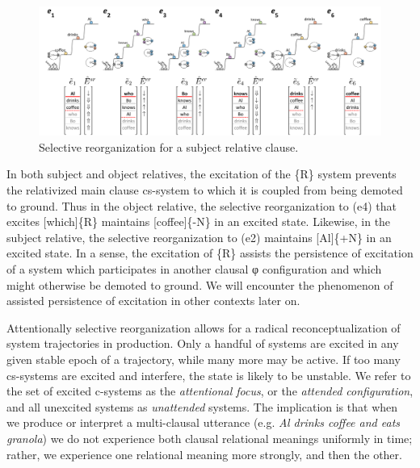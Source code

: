   
\begin{figure}
\includegraphics[width=\textwidth]{figures/Tilsen-img103.png}
\caption{Selective reorganization for a subject relative clause.}
\label{fig:4:53}
\end{figure}
 

  In both subject and object relatives, the excitation of the \{R\} system prevents the relativized main clause cs-system to which it is coupled from being demoted to ground. Thus in the object relative, the selective reorganization to (e4) that excites [which]\{R\} maintains [coffee]\{-N\} in an excited state. Likewise, in the subject relative, the selective reorganization to (e2) maintains [Al]\{+N\} in an excited state. In a sense, the excitation of \{R\} assists the persistence of excitation of a system which participates in another clausal φ configuration and which might otherwise be demoted to ground. We will encounter the phenomenon of assisted persistence of excitation in other contexts later on.

Attentionally selective reorganization allows for a radical reconceptualization of system trajectories in production.  Only a handful of systems are excited in any given stable epoch of a trajectory, while many more may be active. If too many cs-systems are excited and interfere, the state is likely to be unstable. We refer to the set of excited c-systems as the \textit{attentional focus}, or the \textit{attended configuration}, and all unexcited systems as \textit{unattended} systems. The implication is that when we produce or interpret a multi-clausal utterance (e.g. \textit{Al drinks coffee and eats granola}) we do not experience both clausal relational meanings uniformly in time; rather, we experience one relational meaning more strongly, and then the other.


